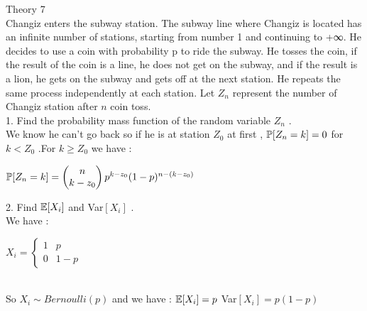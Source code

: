 \documentclass[30pt]{article}
\begin{document}
{\Large \color{blue} Theory 7 } \\
{\color{blue} Changiz enters the subway station. The subway line where Changiz is located has an infinite number of stations, starting from number 1 and continuing to +∞. He decides to use a coin with probability p to ride the subway. He tosses the coin, if the result of the coin is a line, he does not get on the subway, and if the result is a lion, he gets on the subway and gets off at the next station. He repeats the same process independently at each station. Let $Z_n$ represent the number of Changiz station after $n$ coin toss. } \\ \newline
{\color{blue} {\large 1. } Find the probability mass function of the random variable $Z_n$ . } \\ \newline
We know he can't go back so if he is at station $Z_0$ at first , $\Bbb{P}[Z_n = k] = 0 $ for $k < Z_0 $ .For $k \ge Z_0 $ we have : \\ 
\begin{center}
    $\Bbb{P}[Z_n = k] = \begin{pmatrix} n \\ k-z_0 \end{pmatrix} p^{k - z_0}(1 - p)^{n - (k - z_0)}  $
\end{center} \newline
{\color{blue} {\large 2. } Find $\Bbb{E}[X_i] $ and Var$[X_i] $ . } \\ \newline
We have : \\
\begin{center}
    $X_i = 
    \begin{cases}
        1 & p \\
        0 & 1-p
    \end{cases}$
\end{center} \\
So $X_i \sim Bernoulli(p)$ and we have : \hspace{0.25cm} $\Bbb{E}[X_i] = p $ \hspace{0.25cm} Var$[X_i] = p(1-p) $  \\ \newline
\end{document}
